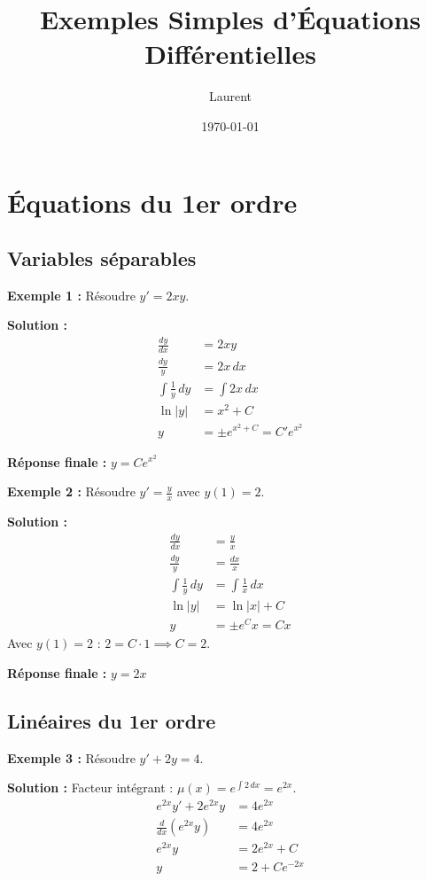 \documentclass[11pt]{article}
\title{Exemples Simples d'Équations Différentielles}
\author{Laurent}
\date{\today}
\begin{document}
\maketitle

\section{Équations du 1er ordre}

\subsection{Variables séparables}

\textbf{Exemple 1 :} Résoudre $y' = 2xy$.

\textbf{Solution :}
\begin{align*}
    \frac{dy}{dx} &= 2xy \\
    \frac{dy}{y} &= 2x \, dx \\
    \int \frac{1}{y} \, dy &= \int 2x \, dx \\
    \ln|y| &= x^2 + C \\
    y &= \pm e^{x^2 + C} = C' e^{x^2}
\end{align*}

\textbf{Réponse finale :} $\boxed{y = C e^{x^2}}$

\bigskip

\textbf{Exemple 2 :} Résoudre $y' = \frac{y}{x}$ avec $y(1) = 2$.

\textbf{Solution :}
\begin{align*}
    \frac{dy}{dx} &= \frac{y}{x} \\
    \frac{dy}{y} &= \frac{dx}{x} \\
    \int \frac{1}{y} \, dy &= \int \frac{1}{x} \, dx \\
    \ln|y| &= \ln|x| + C \\
    y &= \pm e^C x = Cx
\end{align*}
Avec $y(1) = 2$ : $2 = C \cdot 1 \implies C = 2$.

\textbf{Réponse finale :} $\boxed{y = 2x}$

\newpage

\subsection{Linéaires du 1er ordre}

\textbf{Exemple 3 :} Résoudre $y' + 2y = 4$.

\textbf{Solution :}
Facteur intégrant : $\mu(x) = e^{\int 2 \, dx} = e^{2x}$.
\begin{align*}
    e^{2x} y' + 2 e^{2x} y &= 4 e^{2x} \\
    \frac{d}{dx}(e^{2x} y) &= 4 e^{2x} \\
    e^{2x} y &= 2 e^{2x} + C \\
    y &= 2 + C e^{-2x}
\end{align*}
\end{document}
